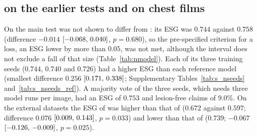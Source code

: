
\subsection{\texorpdfstring{\msn}{MedScope-4B-N} on the earlier tests and on chest films}
\label{subsec:res_nmodel}

On the main test \msn{} was not shown to differ from \ms{}: its ESG was $0.744$ against $0.758$ (difference $-0.014$ $[-0.068,\,0.040]$, $p = 0.680$), so the pre-specified criterion for a loss, an ESG lower by more than $0.05$, was not met, although the interval does not exclude a fall of that size (Table~\ref{tab:nmodel}). Each of its three training seeds ($0.744$, $0.740$ and $0.726$) had a higher ESG than each reference model (smallest difference $0.256$ $[0.171,\,0.338]$; Supplementary Tables~\ref{tab:s_nseeds} and~\ref{tab:s_nseeds_ref}). A majority vote of the three seeds, which needs three model runs per image, had an ESG of $0.753$ and lesion-free claims of 9.0\%. On the external datasets the ESG of \msn{} was higher than that of \ms{} ($0.672$ against $0.597$; difference $0.076$ $[0.009,\,0.143]$, $p = 0.033$) and lower than that of \msp{} ($0.739$; $-0.067$ $[-0.126,\,-0.009]$, $p = 0.025$).

